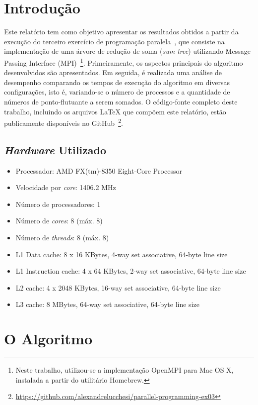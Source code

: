 \documentclass[12pt,a4paper]{article}
\begin{document}


\section{Introdução}
Este relatório tem como objetivo apresentar os resultados obtidos a partir da
execução do terceiro exercício de programação paralela~\cite{exercise}, que
consiste na implementação de uma árvore de redução de soma (\textit{sum tree})
utilizando Message Passing Interface (MPI)~\footnote{Neste trabalho, utilizou-se
a implementação OpenMPI para Mac OS X, instalada a partir do utilitário
Homebrew.}. Primeiramente, os aspectos principais do algoritmo desenvolvidos são
apresentados. Em seguida, é realizada uma análise de desempenho comparando os
tempos de execução do algoritmo em diversas configurações, isto é, variando-se o
número de processos e a quantidade de números de ponto-flutuante a serem
somados. O código-fonte completo deste trabalho, incluindo os arquivos
\LaTeX\xspace que compõem este relatório, estão publicamente disponíveis no
GitHub~\footnote{\url{https://github.com/alexandrelucchesi/parallel-programming-ex03}}.

\subsection{\textit{Hardware} Utilizado}
\label{sec:hardware}

\begin{itemize}
    \item Processador: AMD FX(tm)-8350 Eight-Core Processor
    \item Velocidade por \textit{core}: 1406.2 MHz
    \item Número de processadores: 1
    \item Número de \textit{cores}: 8 (máx. 8)
    \item Número de \textit{threads}: 8 (máx. 8)
    \item L1 Data cache: 8 x 16 KBytes, 4-way set associative, 64-byte line size
    \item L1 Instruction cache: 4 x 64 KBytes, 2-way set associative, 64-byte line size
    \item L2 cache: 4 x 2048 KBytes, 16-way set associative, 64-byte line size
    \item L3 cache: 8 MBytes, 64-way set associative, 64-byte line size
\end{itemize}


\section{O Algoritmo}
\end{document}
